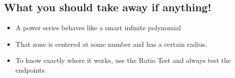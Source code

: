 \documentclass{article}
\begin{document}
\subsection*{What you should take away if anything!}
\begin{itemize}
  \item A power series behaves like a smart infinite polynomial
  \item That zone is centered at some number and has a certain radius.
  \item To know exactly where it works, use the Ratio Test and always test the endpoints.
\end{itemize}
\end{document}
